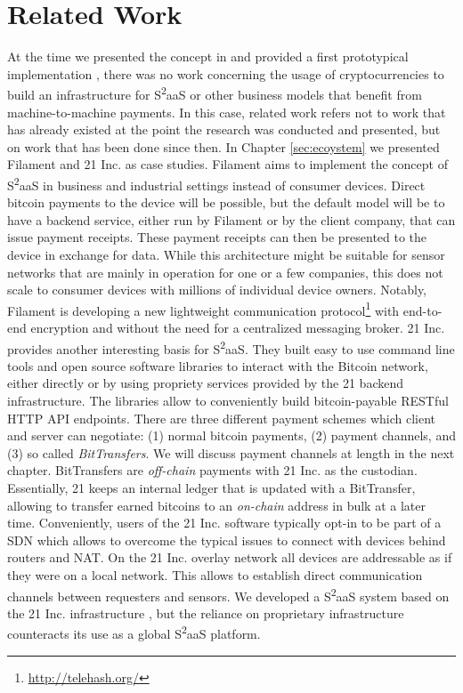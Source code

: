\section{Related Work}
\label{sec:s2aas_relatedwork}

At the time we presented the concept in \parencite{DBLP:journals/corr/NoyenVWF14} and provided a first prototypical implementation \parencite{Worner:2014:YSE:2638728.2638786}, there was no work concerning the usage of cryptocurrencies to build an infrastructure for S\textsuperscript{2}aaS or other business models that benefit from machine-to-machine payments.
In this case, related work refers not to work that has already existed at the point the research was conducted and presented, but on work that has been done since then. 
In Chapter \ref{sec:ecoystem} we presented Filament and 21 Inc. as case studies. Filament aims to implement the concept of S\textsuperscript{2}aaS in business and industrial settings instead of consumer devices. Direct bitcoin payments to the device will be possible, but the default model will be to have a backend service, either run by Filament or by the client company, that can issue payment receipts. These payment receipts can then be presented to the device in exchange for data. While this architecture might be suitable for sensor networks that are mainly in operation for one or a few companies, this does not scale to consumer devices with millions of individual device owners. Notably, Filament is developing a new lightweight communication protocol\footnote{\url{http://telehash.org/}} with end-to-end encryption and without the need for a centralized messaging broker. 21 Inc. provides another interesting basis for S\textsuperscript{2}aaS. They built easy to use command line tools and open source software libraries to interact with the Bitcoin network, either directly or by using propriety services provided by the 21 backend infrastructure. The libraries allow to conveniently build bitcoin-payable \ac{REST}ful \ac{HTTP} \ac{API} endpoints. There are three different payment schemes which client and server can negotiate: (1) normal bitcoin payments, (2) payment channels, and (3) so called \emph{BitTransfers}. We will discuss payment channels at length in the next chapter. BitTransfers are \emph{off-chain} payments with 21 Inc. as the custodian. Essentially, 21 keeps an internal ledger that is updated with a BitTransfer, allowing to transfer earned bitcoins to an \emph{on-chain} address in bulk at a later time. Conveniently, users of the 21 Inc. software typically opt-in to be part of a \ac{SDN} which allows to overcome the typical issues to connect with devices behind routers and \ac{NAT}. On the 21 Inc. overlay network all devices are addressable as if they were on a local network. This allows to establish direct communication channels between requesters and sensors. We developed a S\textsuperscript{2}aaS system based on the 21 Inc. infrastructure \parencite{worner2016design}, but the reliance on proprietary infrastructure counteracts its use as a global S\textsuperscript{2}aaS platform.

